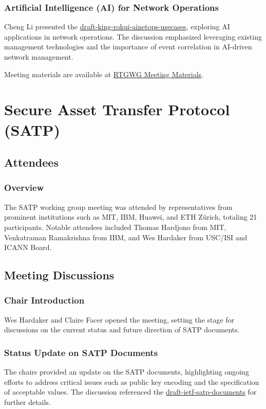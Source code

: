 \documentclass{article}
\begin{document}
\subsubsection{Artificial Intelligence (AI) for Network Operations}
Cheng Li presented the \href{https://datatracker.ietf.org/doc/html/draft-king-rokui-ainetops-usecases}{draft-king-rokui-ainetops-usecases}, exploring AI applications in network operations. The discussion emphasized leveraging existing management technologies and the importance of event correlation in AI-driven network management.

Meeting materials are available at \href{https://datatracker.ietf.org/meeting/122/session/rtgwg}{RTGWG Meeting Materials}.




\newpage

\section{Secure Asset Transfer Protocol (SATP)}

\subsection{Attendees}
\subsubsection{Overview}
The SATP working group meeting was attended by representatives from prominent institutions such as MIT, IBM, Huawei, and ETH Zürich, totaling 21 participants. Notable attendees included Thomas Hardjono from MIT, Venkatraman Ramakrishna from IBM, and Wes Hardaker from USC/ISI and ICANN Board.

\subsection{Meeting Discussions}

\subsubsection{Chair Introduction}
Wes Hardaker and Claire Facer opened the meeting, setting the stage for discussions on the current status and future direction of SATP documents.

\subsubsection{Status Update on SATP Documents}
The chairs provided an update on the SATP documents, highlighting ongoing efforts to address critical issues such as public key encoding and the specification of acceptable values. The discussion referenced the \href{https://datatracker.ietf.org/doc/html/draft-ietf-satp-documents}{draft-ietf-satp-documents} for further details.
\end{document}
